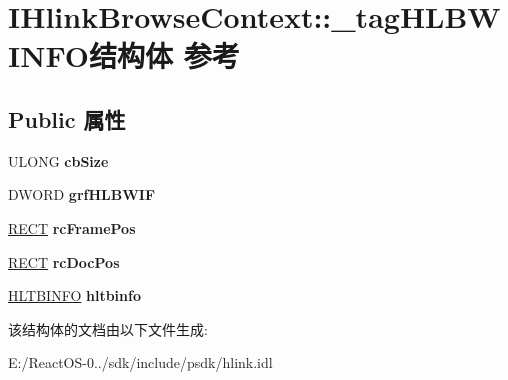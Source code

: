 \hypertarget{struct_i_hlink_browse_context_1_1__tag_h_l_b_w_i_n_f_o}{}\section{I\+Hlink\+Browse\+Context\+:\+:\+\_\+tag\+H\+L\+B\+W\+I\+N\+F\+O结构体 参考}
\label{struct_i_hlink_browse_context_1_1__tag_h_l_b_w_i_n_f_o}
\subsection*{Public 属性}
\begin{DoxyCompactItemize}
\item 
\mbox{\label{struct_i_hlink_browse_context_1_1__tag_h_l_b_w_i_n_f_o_a099983e6daa3dc95e8495fdf6cbeb38c}} 
U\+L\+O\+NG {\bfseries cb\+Size}
\item 
\mbox{\label{struct_i_hlink_browse_context_1_1__tag_h_l_b_w_i_n_f_o_a95c05586c88b82b2414cd805c786c5ec}} 
D\+W\+O\+RD {\bfseries grf\+H\+L\+B\+W\+IF}
\item 
\mbox{\label{struct_i_hlink_browse_context_1_1__tag_h_l_b_w_i_n_f_o_a11fd18846c387a056a4de4dbc35378c1}} 
\hyperlink{structtag_r_e_c_t}{R\+E\+CT} {\bfseries rc\+Frame\+Pos}
\item 
\mbox{\label{struct_i_hlink_browse_context_1_1__tag_h_l_b_w_i_n_f_o_a6de0a4bbc7b9e7b313423dcff9a8ebe1}} 
\hyperlink{structtag_r_e_c_t}{R\+E\+CT} {\bfseries rc\+Doc\+Pos}
\item 
\mbox{\label{struct_i_hlink_browse_context_1_1__tag_h_l_b_w_i_n_f_o_a5ec6349178906c13b07093ee070fe9ef}} 
\hyperlink{struct_i_hlink_browse_context_1_1__tag_h_l_t_b_i_n_f_o}{H\+L\+T\+B\+I\+N\+FO} {\bfseries hltbinfo}
\end{DoxyCompactItemize}


该结构体的文档由以下文件生成\+:\begin{DoxyCompactItemize}
\item 
E\+:/\+React\+O\+S-\/0../sdk/include/psdk/hlink.\+idl\end{DoxyCompactItemize}
